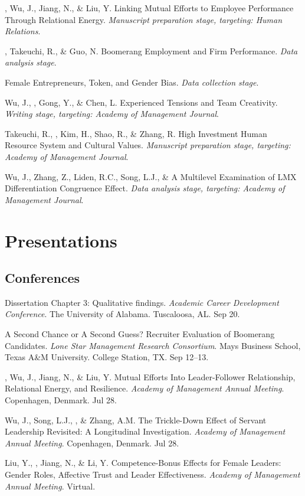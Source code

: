\begin{entries}
    \entn{}, Wu, J., Jiang, N., \& Liu, Y. Linking Mutual Efforts to Employee Performance Through Relational Energy. \textit{Manuscript preparation stage, targeting: Human Relations}.

    \entn{}, Takeuchi, R., \& Guo, N. Boomerang Employment and Firm Performance. \textit{Data analysis stage}.

    \entn{} Female Entrepreneurs, Token, and Gender Bias. \textit{Data collection stage}.

    \entn{}Wu, J., , Gong, Y., \& Chen, L. Experienced Tensions and Team Creativity. \textit{Writing stage, targeting: Academy of Management Journal}.

    \entn{}Takeuchi, R., , Kim, H., Shao, R., \& Zhang, R. High Investment Human Resource System and Cultural Values. \textit{Manuscript preparation stage, targeting: Academy of Management Journal}.

    \entn{}Wu, J., Zhang, Z., Liden, R.C., Song, L.J., \&  A Multilevel Examination of LMX Differentiation Congruence Effect. \textit{Data analysis stage, targeting: Academy of Management Journal}.

\end{entries}
\fi


\ifcvmedium
\section*{Presentations}

\subsection*{Conferences}

\begin{entries}
     Dissertation Chapter 3: Qualitative findings. \textit{Academic Career Development Conference}. The University of Alabama. Tuscaloosa, AL. Sep 20.

     A Second Chance or A Second Guess? Recruiter Evaluation of Boomerang Candidates. \textit{ Lone Star Management Research Consortium}.  Mays Business School, Texas A\&M University. College Station, TX. Sep 12--13.

    , Wu, J., Jiang, N., \& Liu, Y. Mutual Efforts Into Leader-Follower Relationship, Relational Energy, and Resilience. \textit{Academy of Management Annual Meeting}. Copenhagen, Denmark. Jul 28.

    Wu, J., Song, L.J., , \& Zhang, A.M. The Trickle-Down Effect of Servant Leadership Revisited: A Longitudinal Investigation. \textit{Academy of Management Annual Meeting}. Copenhagen, Denmark. Jul 28.

    Liu, Y., , Jiang, N., \& Li, Y. Competence-Bonus Effects for Female Leaders: Gender Roles, Affective Trust and Leader Effectiveness. \textit{Academy of Management Annual Meeting}. Virtual.
\end{entries}


